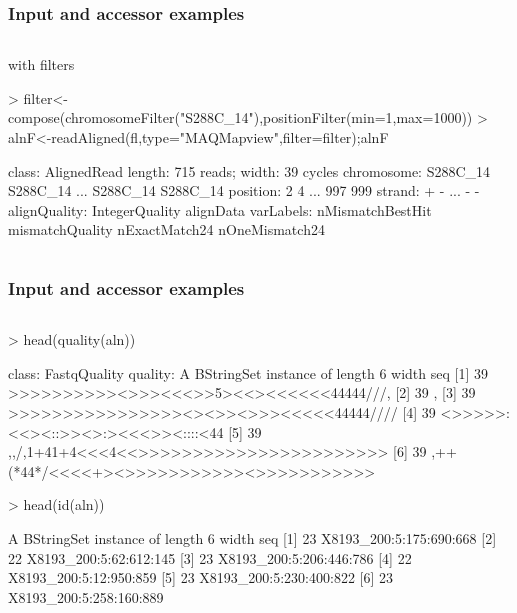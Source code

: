 \documentclass{beamer}
\begin{document}
\begin{frame}[fragile]
\frametitle{Input and accessor examples}
\begin{column}{1\textwidth}
  \bit
       \item with filters
                   \begin{uncoverenv}
\begin{Schunk}
\begin{Sinput}
> filter<- compose(chromosomeFilter("S288C_14"),positionFilter(min=1,max=1000))
> alnF<-readAligned(fl,type="MAQMapview",filter=filter);alnF
\end{Sinput}
\begin{Soutput}
class: AlignedRead
length: 715 reads; width: 39 cycles
chromosome: S288C_14 S288C_14 ... S288C_14 S288C_14 
position: 2 4 ... 997 999 
strand: + - ... - - 
alignQuality: IntegerQuality 
alignData varLabels: nMismatchBestHit mismatchQuality nExactMatch24 nOneMismatch24 
\end{Soutput}
\end{Schunk}
       \end{uncoverenv} 
  \eit
  \end{column}
\end{frame}



\begin{frame}[fragile]
\frametitle{Input and accessor examples}
\begin{column}{1\textwidth}
      \begin{uncoverenv}
\begin{Schunk}
\begin{Sinput}
> head(quality(aln))
\end{Sinput}
\begin{Soutput}
class: FastqQuality
quality:
  A BStringSet instance of length 6
    width seq
[1]    39 >>>>>>>>>><>>><<<>>5><<><<<<<<44444///,
[2]    39 ,%
[3]    39 >>>>>>>>>>>>>>>><><>><>>><<<<<44444////
[4]    39 <>>>>>:<<><::>><>:><<<>><::::<44%
[5]    39 ,,/,1+41+4<<<4<<>>>>>>>>>>>>>>>>>>>>>>>
[6]    39 ,++(*44*/<<<<+><>>>>>>>>>>><>>>>>>>>>>>
\end{Soutput}
\begin{Sinput}
> head(id(aln))
\end{Sinput}
\begin{Soutput}
  A BStringSet instance of length 6
    width seq
[1]    23 X8193_200:5:175:690:668
[2]    22 X8193_200:5:62:612:145
[3]    23 X8193_200:5:206:446:786
[4]    22 X8193_200:5:12:950:859
[5]    23 X8193_200:5:230:400:822
[6]    23 X8193_200:5:258:160:889
\end{Soutput}
\end{Schunk}
       \end{uncoverenv} 
  \end{column}
\end{frame}
\end{document}

